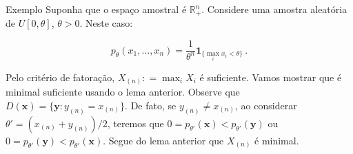 \documentclass[11pt]{beamer}
\begin{document}
	\begin{frame}{Exemplo}
		Suponha que o espaço amostral é $\mathbb{R}^n_+$. Considere uma amostra aleatória de $U[0,\theta]$, $\theta > 0$.  Neste caso:
		
		$$p_\theta(x_1,\ldots, x_n) = \frac{1}{\theta^n} \mathbf{1}_{\{\max_i x_i < \theta\}} \, .  $$
		
		Pelo critério de fatoração, $X_{(n)} : = \max_i X_i$ é suficiente. Vamos mostrar que é minimal suficiente usando o lema anterior. Observe que $D(\boldsymbol{x}) = \{\boldsymbol{y}: y_{(n)} = x_{(n)}\}$. De fato, se $y_{(n)} \neq x_{(n)}$, ao considerar $\theta' = (x_{(n)}+y_{(n)})/2$, teremos que $0 = p_{\theta'}(\boldsymbol{x}) < p_{\theta'}(\boldsymbol{y})$ ou $0 = p_{\theta'}(\boldsymbol{y}) < p_{\theta'}(\boldsymbol{x})$. Segue do lema anterior que $X_{(n)}$ é minimal.
	\end{frame}
	
\end{document}
